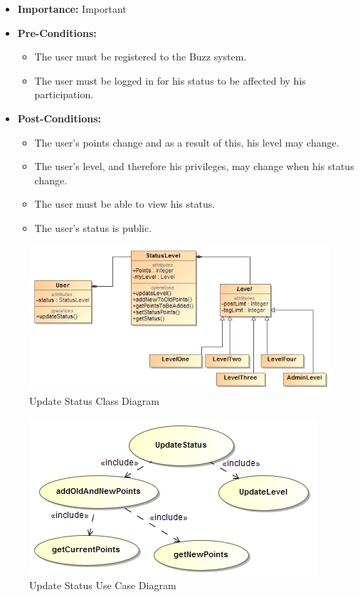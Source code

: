 \documentclass[11pt]{article}
\begin{document}
\begin{enumerate}
\begin{itemize}
\item \textbf{Importance:} Important 
\item\textbf{Pre-Conditions: }
	\begin{itemize}
		\item The user must be registered to the Buzz system.
		\item The user must be logged in for his status to be affected by his participation.

	\end{itemize}

\item\textbf{Post-Conditions: }
	\begin{itemize}
		\item The user's points change and as a result of this, his level may change.
		\item The user's level, and therefore his privileges, may change when his status change.
		\item The user must be able to view his status.
		\item The user's status is public.
	\end{itemize}
\end{itemize}
\graphicspath{ {../Diagrams/Maret/class/} }
	\begin{figure}[H]	
    	\includegraphics[scale=0.5,center]{UpdateStatus.jpg}
    	\caption{Update Status Class Diagram}
	\end{figure}
\graphicspath{ {../Diagrams/Maret/usecase/} }	
	\begin{figure}[H]	
    	\includegraphics[scale=0.5,center]{UpdateStatus.png}
    	\caption{Update Status Use Case Diagram}
	\end{figure}
	

\end{enumerate}
\end{document}
